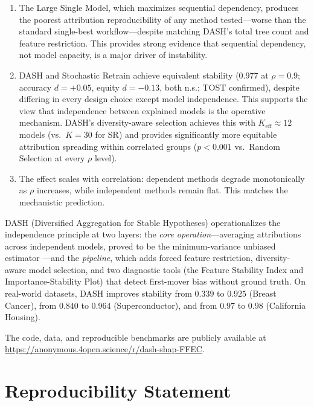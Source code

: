 \documentclass[10pt]{article}
\newcommand{\dash}{\textsc{DASH}}
\newcommand{\rhovar}{\rho}
\begin{document}
\begin{enumerate}
  \item The Large Single Model, which maximizes sequential dependency,
    produces the poorest attribution reproducibility of any method tested---worse
    than the standard single-best workflow---despite matching \dash{}'s
    total tree count and feature restriction. This provides strong evidence that
    sequential dependency, not model capacity, is a major driver of instability.
  \item \dash{} and Stochastic Retrain achieve equivalent
    stability ($0.977$ at $\rhovar = 0.9$; accuracy $d = +0.05$,
    equity $d = -0.13$, both n.s.; TOST confirmed),
    despite differing in every design choice except model independence.
    This supports the view that independence between explained models is the
    operative mechanism. \dash{}'s diversity-aware selection achieves this
    with $K_{\text{eff}} \approx 12$ models (vs.\ $K = 30$ for SR) and
    provides significantly more equitable attribution spreading within
    correlated groups ($p < 0.001$ vs.\ Random Selection at every
    $\rhovar$ level).
  \item The effect scales with correlation: dependent methods degrade
    monotonically as $\rhovar$ increases, while independent methods
    remain flat. This matches the mechanistic prediction.
\end{enumerate}

\dash{} (Diversified Aggregation for Stable Hypotheses) operationalizes the
independence principle at two layers: the \emph{core operation}---averaging
attributions across independent models, proved to be the minimum-variance
unbiased estimator \citep{caraker2026impossibility}---and the
\emph{pipeline}, which adds forced feature restriction, diversity-aware
model selection, and two diagnostic tools (the Feature Stability
Index and Importance-Stability Plot) that detect first-mover bias
without ground truth. On real-world datasets, \dash{} improves stability
from $0.339$ to $0.925$ (Breast Cancer), from $0.840$ to $0.964$
(Superconductor), and from $0.97$ to $0.98$ (California Housing).

The code, data, and reproducible benchmarks are publicly available at
\url{https://anonymous.4open.science/r/dash-shap-FFEC}.


\section*{Reproducibility Statement}
\end{document}
